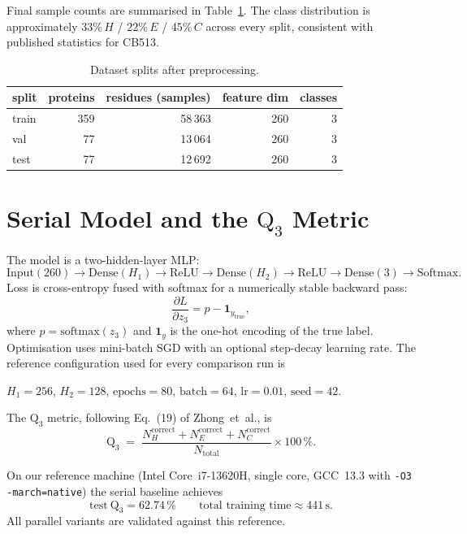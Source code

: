 \documentclass[11pt,a4paper]{article}
\begin{document}
Final sample counts are summarised in Table~\ref{tab:data}. The class
distribution is approximately $33\%\,H$ / $22\%\,E$ / $45\%\,C$ across every
split, consistent with published statistics for CB513.

\begin{table}[H]
  \centering
  \caption{Dataset splits after preprocessing.}\label{tab:data}
  \begin{tabular}{lrrrr}
    \toprule
    split & proteins & residues (samples) & feature dim & classes\\
    \midrule
    train & 359 & 58\,363 & 260 & 3\\
    val   &  77 & 13\,064 & 260 & 3\\
    test  &  77 & 12\,692 & 260 & 3\\
    \bottomrule
  \end{tabular}
\end{table}

\section{Serial Model and the \texorpdfstring{$\mathrm{Q}_3$}{Q3} Metric}
\label{sec:serial}

The model is a two-hidden-layer MLP:
\[
  \text{Input}(260)\to\text{Dense}(H_1)\to\text{ReLU}
  \to\text{Dense}(H_2)\to\text{ReLU}\to\text{Dense}(3)\to\text{Softmax}.
\]
Loss is cross-entropy fused with softmax for a numerically stable
backward pass:
\[
  \frac{\partial L}{\partial z_3} = p - \mathbf{1}_{y_{\text{true}}},
\]
where $p=\mathrm{softmax}(z_3)$ and $\mathbf{1}_{y}$ is the one-hot
encoding of the true label. Optimisation uses mini-batch SGD with an
optional step-decay learning rate. The reference configuration used for
every comparison run is
\begin{center}
  \(H_1=256\), \(H_2=128\), \(\mathrm{epochs}=80\), \(\mathrm{batch}=64\),
  \(\mathrm{lr}=0.01\), \(\mathrm{seed}=42\).
\end{center}

The $\mathrm{Q}_3$ metric, following Eq.~(19) of Zhong~et~al., is
\begin{equation}\label{eq:q3}
  \mathrm{Q}_3 \;=\;
  \frac{N^{\text{correct}}_H + N^{\text{correct}}_E + N^{\text{correct}}_C}%
       {N_{\text{total}}} \times 100\,\%.
\end{equation}

On our reference machine (Intel Core~i7-13620H, single core, GCC~13.3 with
\texttt{-O3 -march=native}) the serial baseline achieves
\[
  \boxed{\text{test}\ \mathrm{Q}_3 = 62.74\,\%} \qquad
  \text{total training time}\approx 441\,\mathrm{s}.
\]
All parallel variants are validated against this reference.
\end{document}
